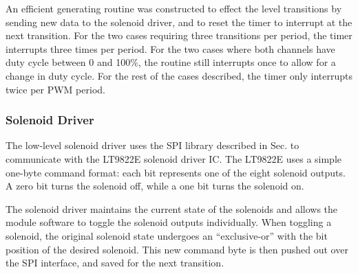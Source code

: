An efficient generating routine was constructed to effect the level transitions by sending new data to the solenoid driver, and to reset the timer to interrupt at the next transition. For the two cases requiring three transitions per period, the timer interrupts three times per period. For the two cases where both channels have duty cycle between 0 and 100\%, the routine still interrupts once to allow for a change in duty cycle. For the rest of the cases described, the timer only interrupts twice per PWM period.



\subsubsection{Solenoid Driver}

The low-level solenoid driver uses the SPI library described in Sec. \label{sec:impl_spi_driver} to communicate with the LT9822E solenoid driver IC. The LT9822E uses a simple one-byte command format: each bit represents one of the eight solenoid outputs. A zero bit turns the solenoid off, while a one bit turns the solenoid on. 

The solenoid driver maintains the current state of the solenoids and allows the module software to toggle the solenoid outputs individually. When toggling a solenoid, the original solenoid state undergoes an ``exclusive-or'' with the bit position of the desired solenoid. This new command byte is then pushed out over the SPI interface, and saved for the next transition.

